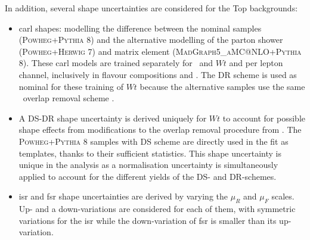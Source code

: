 In addition, several shape uncertainties are considered for the Top backgrounds: 
\begin{itemize}[leftmargin=*]
    \item \gls{carl} shapes: modelling the difference between the nominal samples (\textsc{Powheg}+\textsc{Pythia} 8) and the alternative modelling of the parton shower (\textsc{Powheg}+\textsc{Herwig} 7) and matrix element (\textsc{MadGraph5\_aMC@NLO}+\textsc{Pythia} 8). These \gls{carl} models are trained separately for \ttb\ and $Wt$ and per lepton channel, inclusively in flavour compositions and \nj. The DR scheme is used as nominal for these training of $Wt$ because the alternative samples use the same \ttb\ overlap removal scheme \cite{StefanoFrixione_2008}. 
    \item A DS-DR shape uncertainty is derived uniquely for $Wt$ to account for possible shape effects from modifications to the overlap removal procedure from \ttb. The \textsc{Powheg}+\textsc{Pythia} 8 samples with DS scheme are directly used in the fit as templates, thanks to their sufficient statistics. This shape uncertainty is unique in the analysis as a normalisation uncertainty is simultaneously applied to account for the different yields of the DS- and DR-schemes.
    \item \gls{isr} and \gls{fsr} shape uncertainties are derived by varying the $\mu_R$ and $\mu_F$ scales. Up- and a down-variations are considered for each of them, with symmetric variations for the \gls{isr} while the down-variation of \gls{fsr} is smaller than its up-variation.
\end{itemize} 

